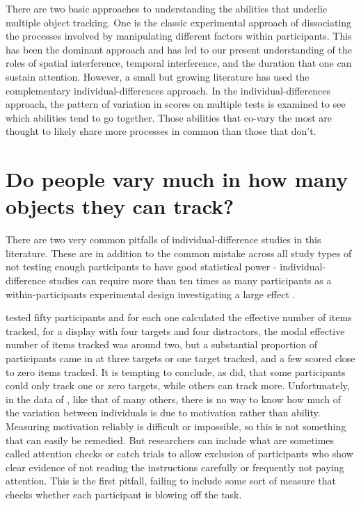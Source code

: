 \documentclass[
]{book}
\begin{document}
There are two basic approaches to understanding the abilities that underlie multiple object tracking. One is the classic experimental approach of dissociating the processes involved by manipulating different factors within participants. This has been the dominant approach and has led to our present understanding of the roles of spatial interference, temporal interference, and the duration that one can sustain attention. However, a small but growing literature has used the complementary individual-differences approach. In the individual-differences approach, the pattern of variation in scores on multiple tests is examined to see which abilities tend to go together. Those abilities that co-vary the most are thought to likely share more processes in common than those that don't.

\hypertarget{do-people-vary-much-in-how-many-objects-they-can-track}{%
\section{Do people vary much in how many objects they can track?}\label{do-people-vary-much-in-how-many-objects-they-can-track}}

There are two very common pitfalls of individual-difference studies in this literature. These are in addition to the common mistake across all study types of not testing enough participants to have good statistical power - individual-difference studies can require more than ten times as many participants as a within-participants experimental design investigating a large effect \citep{schonbrodtWhatSampleSize2013}.

\citet{meyerhoffIndividualDifferencesVisual2020} tested fifty participants and for each one calculated the effective number of items tracked, for a display with four targets and four distractors, the modal effective number of items tracked was around two, but a substantial proportion of participants came in at three targets or one target tracked, and a few scored close to zero items tracked. It is tempting to conclude, as \citet{meyerhoffIndividualDifferencesVisual2020} did, that some participants could only track one or zero targets, while others can track more. Unfortunately, in the data of \citet{meyerhoffIndividualDifferencesVisual2020}, like that of many others, there is no way to know how much of the variation between individuals is due to motivation rather than ability. Measuring motivation reliably is difficult or impossible, so this is not something that can easily be remedied. But researchers can include what are sometimes called attention checks or catch trials to allow exclusion of participants who show clear evidence of not reading the instructions carefully or frequently not paying attention. This is the first pitfall, failing to include some sort of measure that checks whether each participant is blowing off the task.
\end{document}
